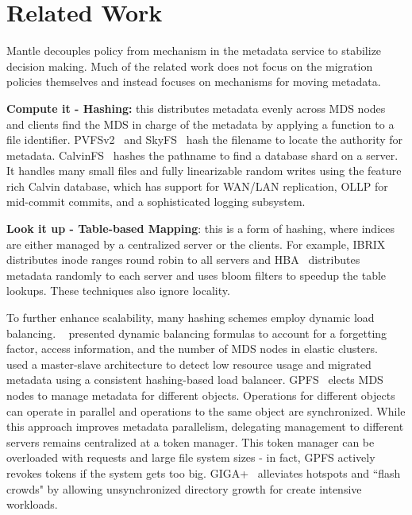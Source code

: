 \section{Related Work}									%
\label{related-work}									%
Mantle decouples policy from mechanism in the metadata service to stabilize decision making. Much of the related work does not focus on the migration policies themselves and instead focuses on mechanisms for moving metadata. 

\textbf{Compute it - Hashing:} this distributes metadata evenly across MDS
nodes and clients find the MDS in charge of the metadata by applying a function
to a file identifier. PVFSv2~\cite{hildebrand:msst2005-pnfs} and
SkyFS~\cite{xing:sc2009-skyfs} hash the filename to locate the authority for
metadata. CalvinFS~\cite{thomson:fast2015-calvinfs} hashes the pathname to find
a database shard on a server. It handles many small files and fully
linearizable random writes using the feature rich Calvin database, which has
support for WAN/LAN replication, OLLP for mid-commit commits, and a
sophisticated logging subsystem. 

\textbf{Look it up - Table-based Mapping}: this is a form of hashing, where
indices are either managed by a centralized server or the clients. For example,
IBRIX~\cite{hp:whitepaper2012-storeall} distributes inode ranges round robin to
all servers and HBA~\cite{zhu:pds2008-hba} distributes metadata randomly to
each server and uses bloom filters to speedup the table lookups. These
techniques also ignore locality.



To further enhance scalability, many hashing schemes employ dynamic load balancing. ~\cite{li:msst2006-dynamic} presented dynamic balancing formulas to account for a forgetting factor, access information, and the number of MDS nodes in elastic clusters.~\cite{xing:sc2009-skyfs} used a master-slave architecture to detect low resource usage and migrated metadata using a consistent hashing-based load balancer. GPFS~\cite{schmuck:fast2002-gpfs} elects MDS nodes to manage metadata for different objects. Operations for different objects can operate in parallel and operations to the same object are synchronized. While this approach improves metadata parallelism, delegating management to different servers remains centralized at a token manager. This token manager can be overloaded with requests and large file system sizes - in fact, GPFS actively revokes tokens if the system gets too big. GIGA+~\cite{patil:fast2011-giga+} alleviates hotspots and ``flash crowds" by allowing unsynchronized directory growth for create intensive workloads. 

